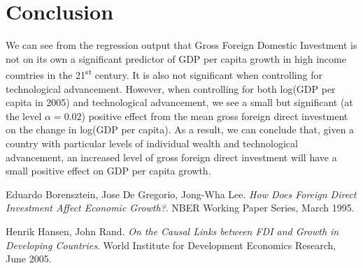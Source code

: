 \documentclass{article}
\begin{document}
\section{Conclusion}
\quad We can see from the regression output that Gross Foreign Domestic Investment is not on its own a significant predictor of GDP per capita growth in high income countries in the 21\textsuperscript{st} century. It is also not significant when controlling for technological advancement. However, when controlling for both log(GDP per capita in 2005) and technological advancement, we see a small but significant (at the level $\alpha = 0.02$) positive effect from the mean gross foreign direct investment on the change in log(GDP per capita). As a result, we can conclude that, given a country with particular levels of individual wealth and technological advancement, an increased level of gross foreign direct investment will have a small positive effect on GDP per capita growth.
\newpage
\begin{thebibliography}{9}
Eduardo Borensztein, Jose De Gregorio, Jong-Wha Lee.
\textit{How Does Foreign Direct Investment Affect Economic Growth?}. NBER Working Paper Series, March 1995.

Henrik Hansen, John Rand.
\textit{On the Causal Links between FDI and Growth in Developing Countries}.
World Institute for Development Economics Research, June 2005.

\end{thebibliography}
\end{document}
